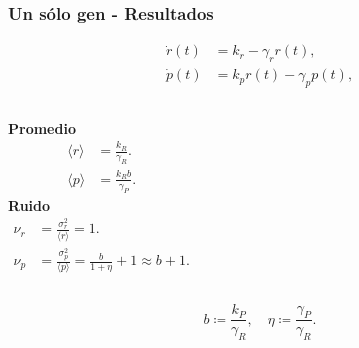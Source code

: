 \documentclass[10pt]{beamer}
\begin{document}
\begin{frame}
\frametitle{Un s\'olo gen - Resultados}
\begin{align*}
\dot{r}(t) &= k_r - \gamma_rr(t),\\
\dot{p}(t) &= k_pr(t) - \gamma_pp(t),
\end{align*}

\begin{columns}[c]
\centering \textbf{Promedio}
\begin{align*}
\langle r \rangle &= \frac{k_R}{\gamma_R}.\\[1.5ex]
\langle p \rangle &= \frac{k_Rb}{\gamma_P}.
\end{align*}
\centering \textbf{Ruido}
\begin{align*}
\nu_r &= \frac{\sigma_r^2}{\langle r \rangle} = 1.\\[1.5ex]
\nu_p &= \frac{\sigma_p^2}{\langle p \rangle} = \frac{b}{1+\eta} + 1 \approx b + 1.
\end{align*}
\end{columns}

\vspace{3 mm}

\begin{equation*}
b \coloneqq \frac{k_P}{\gamma_R}, \quad \eta \coloneqq \frac{\gamma_P}{\gamma_R}.
\end{equation*}

\end{frame}
\end{document}
